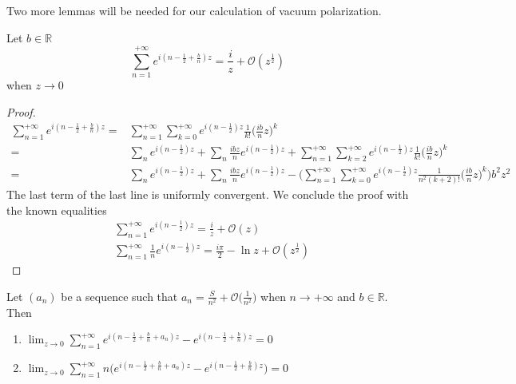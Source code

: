 Two more lemmas will be needed for our calculation of vacuum polarization.
\begin{lemma}
Let $b\in\mathbb{R}$
\begin{equation*}
\sum_{n=1}^{+\infty} e^{i(n - \frac 1 2+\frac b n)z} = \frac i z  + \mathcal{O}(z^{\frac 1 2})
\end{equation*}
when $z\rightarrow 0 $
\end{lemma}
\begin{proof}
\begin{equation*}
\begin{split}
\sum_{n=1}^{+\infty} e^{i(n - \frac 1 2 +\frac b n)z} = & 
\sum_{n=1}^{+\infty} \sum_{k=0}^{+\infty} e^{i(n - \frac 1 2)z} \frac{1}{k!}\big(\frac{ib}{n}z\big)^k \\
%
= & \sum_n e^{i(n-\frac 1 2 )z} + \sum_n \frac{ibz}{n}e^{i(n-\frac 1 2 )z} + \sum_{n=1}^{+\infty} \sum_{k=2}^{+\infty} e^{i(n-\frac 1 2)z} \frac{1}{k!}\big(\frac{ib}{n}z\big)^k  \\
%
= & \sum_n e^{i(n-\frac 1 2)z} + \sum_n \frac{ibz}{n}e^{i(n-\frac 1 2)z} - 
\bigg(\sum_{n=1}^{+\infty} \sum_{k=0}^{+\infty} 
e^{i(n-\frac 1 2)z} \frac{1}{n^2(k+2)!}\big(\frac{ib}{n}z\big)^k 
\bigg)b^2z^2
\end{split}
\end{equation*}
The last term of the last line is uniformly convergent.
We conclude the proof with the known equalities
\begin{equation}\label{wen-lem1n}
\begin{split}
& \sum_{n=1}^{+\infty}e^{i(n - \frac 1 2 )z} = 
\frac i z  + \mathcal{O}(z) \\
%
& \sum_{n=1}^{+\infty}\frac 1 n e^{i(n-\frac 1 2)z} =
\frac{i\pi}{2} - \ln z + \mathcal{O}(z^\frac{1}{2})
\end{split}
\end{equation}
\end{proof}
%
\begin{lemma}\label{wen-lemmacvu}
Let $(a_n)$ be a sequence such that $a_n = \frac{S}{n^2}+\mathcal{O}\big(\frac{1}{n^2})$ when $n\rightarrow+\infty$ and $b\in\mathbb{R}$. Then
\begin{enumerate}[font=\normalfont]
\item 
$
\lim_{z\rightarrow 0}\sum_{n=1}^{+\infty} e^{i(n-\frac 1 2+\frac{b}{n}+a_n)z } - e^{i(n-\frac 1 2+\frac{b}{n})z }=0
$
\item 
$
\lim_{z\rightarrow 0}\sum_{n=1}^{+\infty}n\big( e^{i(n-\frac 1 2+\frac{b}{n}+a_n)z } - e^{i(n-\frac 1 2+\frac{b}{n})z }\big)=0
$
\end{enumerate}
\end{lemma}

